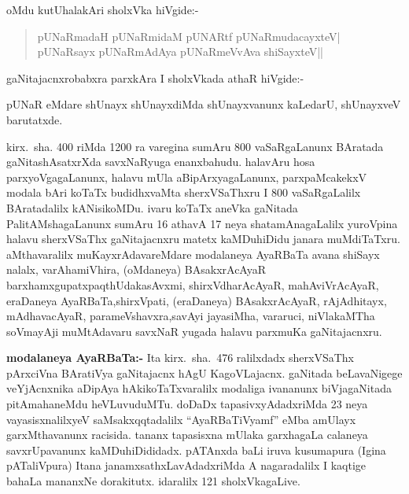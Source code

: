 oMdu kutUhalakAri sholxVka hiVgide:-
\begin{verse}
pUNaRmadaH pUNaRmidaM pUNARtf pUNaRmudacayxteV|\\
pUNaRsayx pUNaRmAdAya pUNaRmeVvAva shiSayxteV||
\end{verse}
gaNitajacnxrobabxra parxkAra I sholxVkada athaR hiVgide:-

pUNaR eMdare shUnayx shUnayxdiMda shUnayxvanunx kaLedarU, shUnayxveV barutatxde.

kirx.~sha. {\rm 400} riMda {\rm 1200} ra varegina sumAru {\rm 800} vaSaRgaLanunx BAratada gaNita\-shAsatxrXda savxNaRyuga enanxbahudu. halavAru hosa parxyoVgagaLanunx, halavu mUla aBipArxyagaLanunx, parxpaMcakekxV modala bAri koTaTx budidhxvaMta sherxVSaThxru I {\rm 800} vaSaR\-gaLalilx BAratadalilx kANisikoMDu. ivaru koTaTx aneVka gaNitada PalitAMshagaLanunx sumAru {\rm 16} athavA {\rm 17} neya shatamAnagaLalilx yuroVpina halavu sherxVSaThx gaNita\-jacnxru matetx kaMDuhiDidu janara muMdiTaTxru. aMthavaralilx muKayxrAdavareMdare modalaneya AyaRBaTa avana shiSayx nalalx, varAhamiVhira, (oMdaneya) BAsakxrAcAyaR barxhamxgupatx\break paqthUdakasAvxmi, shirxVdharAcAyaR, mahAviVrAcAyaR, eraDaneya AyaRBaTa,\break shirxVpati, (eraDaneya) BAsakxrAcAyaR, rAjAdhitayx, mAdhavacAyaR, parameVshavxra,\break savAyi jayasiMha, vararuci, niVlakaMTha soVmayAji muMtAdavaru savxNaR \-yugada halavu parxmuKa gaNitajacnxru.

\textbf{modalaneya AyaRBaTa:-} Ita kirx.~sha.~{\rm 476} ralilxdadx sherxVSaThx pArxciVna BAratiVya gaNitajacnx hAgU KagoVLajacnx. gaNitada beLavaNigege veYjAcnxnika aDipAya hAkikoTaTxvaralilx modaliga ivananunx biVjagaNitada pitAmahaneMdu heVLuvuduMTu. doDaDx tapasivxyAdadxriMda {\rm 23} neya vayasisxnalilxyeV saMsakxqqtadalilx ``AyaRBaTiVyamf'' eMba amUlayx garxMthavanunx racisida. tananx tapasisxna mUlaka garxhagaLa calaneya savxrUpavanunx kaMDuhiDididadx. pATAnxda baLi iruva kusumapura (Igina pATaliVpura) Itana janamxsathxLavAdadxriMda  A nagaradalilx I kaqtige bahaLa mananxNe dorakitutx. idaralilx {\rm 121} sholxVkagaLive.

